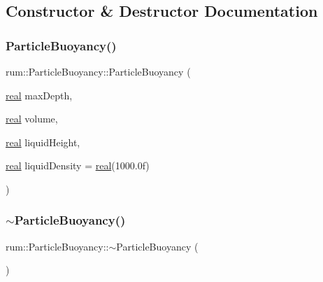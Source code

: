 \subsection{Constructor \& Destructor Documentation}
\mbox{\label{classrum_1_1_particle_buoyancy_a25df269bba530e8275ee0e22e9fce166}} 
\subsubsection{\texorpdfstring{Particle\+Buoyancy()}{ParticleBuoyancy()}}
{\footnotesize\ttfamily rum\+::\+Particle\+Buoyancy\+::\+Particle\+Buoyancy (\begin{DoxyParamCaption}\item[{\mbox{\hyperlink{namespacerum_a7e8cca23573d5eaead0f138cbaa4862c}{real}}}]{max\+Depth,  }\item[{\mbox{\hyperlink{namespacerum_a7e8cca23573d5eaead0f138cbaa4862c}{real}}}]{volume,  }\item[{\mbox{\hyperlink{namespacerum_a7e8cca23573d5eaead0f138cbaa4862c}{real}}}]{liquid\+Height,  }\item[{\mbox{\hyperlink{namespacerum_a7e8cca23573d5eaead0f138cbaa4862c}{real}}}]{liquid\+Density = {\ttfamily \mbox{\hyperlink{namespacerum_a7e8cca23573d5eaead0f138cbaa4862c}{real}}(1000.0f)} }\end{DoxyParamCaption})\hspace{0.3cm}{\ttfamily [explicit]}}

\mbox{\label{classrum_1_1_particle_buoyancy_a892e6f064e5eb1be8e7d2af8c76b856c}} 
\subsubsection{\texorpdfstring{$\sim$\+Particle\+Buoyancy()}{~ParticleBuoyancy()}}
{\footnotesize\ttfamily rum\+::\+Particle\+Buoyancy\+::$\sim$\+Particle\+Buoyancy (\begin{DoxyParamCaption}{ }\end{DoxyParamCaption})}



